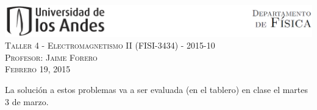 \documentclass[letterpaper,10pt,onecolumn]{article}
\begin{document}
\begin{center}

\includegraphics[width=490pt]{header.png}\\[0.5cm]

\textsc{\LARGE Taller 4 - Electromagnetismo II (FISI-3434) - 2015-10}\\[0.5cm]

\textsc{\Large{Profesor: Jaime Forero}} \\[0.5cm]

\textsc{Febrero 19, 2015} \\[0.5cm]

\end{center}


La soluci\'on a estos problemas va a ser evaluada (en el tablero) en
clase el martes 3 de marzo.
\end{document}
